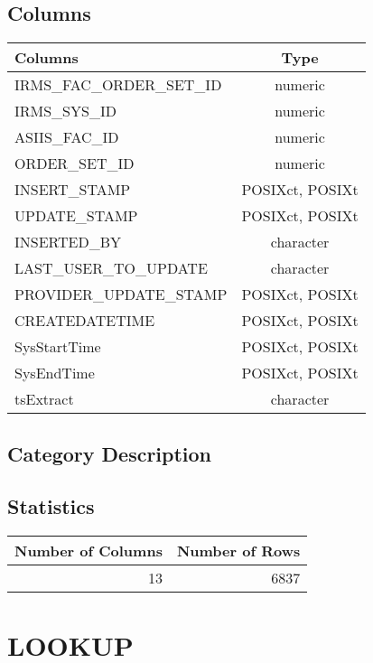 \documentclass[
  letterpaper,
  DIV=11,
  numbers=noendperiod]{scrreprt}
\begin{document}
\hypertarget{columns-16}{%
\section*{Columns}\label{columns-16}}

\begin{longtable}{lc}
\toprule
Columns & Type \\ 
\midrule
IRMS\_FAC\_ORDER\_SET\_ID & numeric \\ 
IRMS\_SYS\_ID & numeric \\ 
ASIIS\_FAC\_ID & numeric \\ 
ORDER\_SET\_ID & numeric \\ 
INSERT\_STAMP & POSIXct, POSIXt \\ 
UPDATE\_STAMP & POSIXct, POSIXt \\ 
INSERTED\_BY & character \\ 
LAST\_USER\_TO\_UPDATE & character \\ 
PROVIDER\_UPDATE\_STAMP & POSIXct, POSIXt \\ 
CREATEDATETIME & POSIXct, POSIXt \\ 
SysStartTime & POSIXct, POSIXt \\ 
SysEndTime & POSIXct, POSIXt \\ 
tsExtract & character \\ 
\bottomrule
\end{longtable}

\hypertarget{category-description-16}{%
\section*{Category Description}\label{category-description-16}}

\hypertarget{statistics-16}{%
\section*{Statistics}\label{statistics-16}}

\begin{longtable}{rr}
\toprule
Number of Columns & Number of Rows \\ 
\midrule
13 & 6837 \\ 
\bottomrule
\end{longtable}

\hypertarget{lookup}{%
\chapter*{LOOKUP}\label{lookup}}
\end{document}
